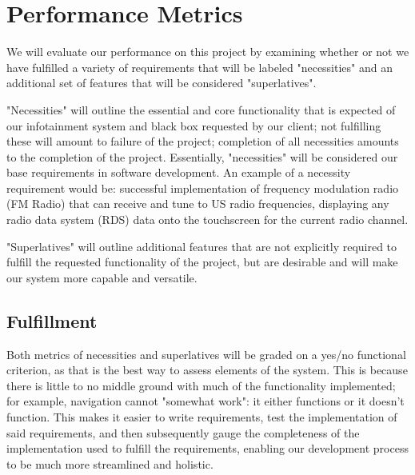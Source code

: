 \documentclass[onecolumn, draftclsnofoot,10pt, compsoc]{IEEEtran}
\begin{document}
\section{Performance Metrics}
We will evaluate our performance on this project by examining whether or not we have fulfilled a variety of requirements that will be labeled "necessities" and an additional set of  features that will be considered "superlatives".\par
"Necessities" will outline the essential and core functionality that is expected of our infotainment system and black box requested by our client; not fulfilling these will amount to failure of the project; completion of all necessities amounts to the completion of the project. Essentially, "necessities" will be considered our base requirements in software development. An example of a necessity requirement would be: successful implementation of frequency modulation radio (FM Radio) that can receive and tune to US radio frequencies, displaying any radio data system (RDS) data onto the touchscreen for the current radio channel.\par
"Superlatives" will outline additional features that are not explicitly required to fulfill the requested functionality of the project, but are desirable and will make our system more capable and versatile.\par

\subsection{Fulfillment}
Both metrics of necessities and superlatives will be graded on a yes/no functional criterion, as that is the best way to assess elements of the system. This is because there is little to no middle ground with much of the functionality implemented; for example, navigation cannot "somewhat work": it either functions or it doesn't function. This makes it easier to write requirements, test the implementation of said requirements, and then subsequently gauge the completeness of the  implementation used to fulfill the requirements, enabling our development process to be much more streamlined and holistic.\par
\end{document}
